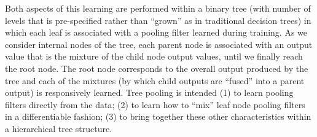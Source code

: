 \documentclass[twoside]{article}
\begin{document}
Both aspects of this learning are performed within a binary tree (with number of levels that is 
pre-specified rather than ``grown'' as in traditional decision trees) in which each 
leaf is associated with a pooling filter learned during training. As we consider internal nodes 
of the tree, each parent node is associated with an output value that is the mixture 
of the child node output values, until we finally reach the root node. The root
node corresponds to the overall output produced by the tree and each of the mixtures 
(by which child outputs are ``fused'' into a parent output) is responsively learned. 
Tree pooling is intended (1) to learn pooling filters directly from the data;
(2) to learn how to ``mix'' leaf node pooling filters in a differentiable fashion; 
(3) to bring together these other characteristics within a hierarchical tree structure.
\end{document}
